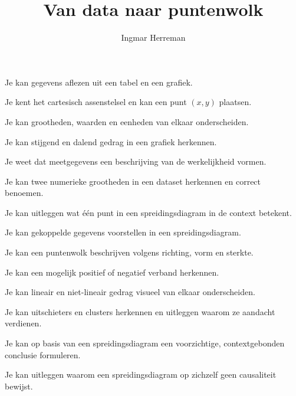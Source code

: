 \documentclass{ximera}
\title{Van data naar puntenwolk}
\author{Ingmar Herreman}
\begin{document}



















\maketitle

\begin{voorkennis}
  \item Je kan gegevens aflezen uit een tabel en een grafiek.
  \item Je kent het cartesisch assenstelsel en kan een punt $(x,y)$ plaatsen.
  \item Je kan grootheden, waarden en eenheden van elkaar onderscheiden.
  \item Je kan stijgend en dalend gedrag in een grafiek herkennen.
  \item Je weet dat meetgegevens een beschrijving van de werkelijkheid vormen.
\end{voorkennis}

\begin{leerdoelen}
  \item Je kan twee numerieke grootheden in een dataset herkennen en correct benoemen.
  \item Je kan uitleggen wat één punt in een spreidingsdiagram in de context betekent.
  \item Je kan gekoppelde gegevens voorstellen in een spreidingsdiagram.
  \item Je kan een puntenwolk beschrijven volgens richting, vorm en sterkte.
  \item Je kan een mogelijk positief of negatief verband herkennen.
  \item Je kan lineair en niet-lineair gedrag visueel van elkaar onderscheiden.
  \item Je kan uitschieters en clusters herkennen en uitleggen waarom ze aandacht verdienen.
  \item Je kan op basis van een spreidingsdiagram een voorzichtige, contextgebonden conclusie formuleren.
  \item Je kan uitleggen waarom een spreidingsdiagram op zichzelf geen causaliteit bewijst.
\end{leerdoelen}
\end{document}
